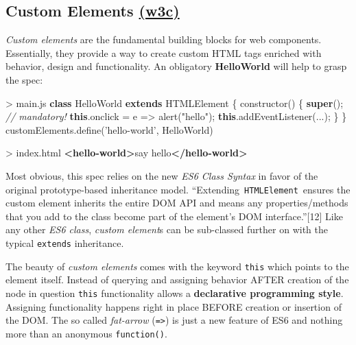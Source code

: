 \documentclass[]{assets/latex/ieee}
\newenvironment{Shaded}{}{}
\newcommand{\KeywordTok}[1]{\textcolor[rgb]{0.00,0.44,0.13}{\textbf{{#1}}}}
\newcommand{\StringTok}[1]{\textcolor[rgb]{0.25,0.44,0.63}{{#1}}}
\newcommand{\CommentTok}[1]{\textcolor[rgb]{0.38,0.63,0.69}{\textit{{#1}}}}
\newcommand{\VariableTok}[1]{\textcolor[rgb]{0.10,0.09,0.49}{{#1}}}
\newcommand{\OperatorTok}[1]{\textcolor[rgb]{0.40,0.40,0.40}{{#1}}}
\newcommand{\AttributeTok}[1]{\textcolor[rgb]{0.49,0.56,0.16}{{#1}}}
\newcommand{\NormalTok}[1]{{#1}}
\begin{document}
\subsection{\texorpdfstring{Custom Elements
\href{http://w3c.github.io/webcomponents/spec/custom/}{(w3c)}}{Custom Elements (w3c)}}\label{custom-elements-w3c}

\emph{Custom elements} are the fundamental building blocks for web
components. Essentially, they provide a way to create custom HTML tags
enriched with behavior, design and functionality. An obligatory
\textbf{HelloWorld} will help to grasp the spec:

\begin{Shaded}
\begin{Highlighting}[]
\OperatorTok{>} \VariableTok{main}\NormalTok{.}\AttributeTok{js}
\KeywordTok{class} \NormalTok{HelloWorld }\KeywordTok{extends} \NormalTok{HTMLElement }\OperatorTok{\{}
 \AttributeTok{constructor}\NormalTok{() }\OperatorTok{\{}
  \KeywordTok{super}\NormalTok{()}\OperatorTok{;} \CommentTok{// mandatory!}
  \KeywordTok{this}\NormalTok{.}\AttributeTok{onclick} \OperatorTok{=} \NormalTok{e }\OperatorTok{=>} \AttributeTok{alert}\NormalTok{(}\StringTok{"hello"}\NormalTok{)}\OperatorTok{;}
  \KeywordTok{this}\NormalTok{.}\AttributeTok{addEventListener}\NormalTok{(...)}\OperatorTok{;}
 \OperatorTok{\}}
\OperatorTok{\}}
\VariableTok{customElements}\NormalTok{.}\AttributeTok{define}\NormalTok{(}\StringTok{'hello-world'}\OperatorTok{,} \NormalTok{HelloWorld)}
\end{Highlighting}
\end{Shaded}

\begin{Shaded}
\begin{Highlighting}[]
\NormalTok{> index.html}
\KeywordTok{<hello-world>}\NormalTok{say hello}\KeywordTok{</hello-world>}
\end{Highlighting}
\end{Shaded}

Most obvious, this spec relies on the new \emph{ES6 Class Syntax} in
favor of the original prototype-based inheritance model.
``Extending~\texttt{HTMLElement}~ensures the custom element inherits the
entire DOM API and means any properties/methods that you add to the
class become part of the element's DOM interface.''{[}12{]} Like any
other \emph{ES6 class}, \emph{custom element}s can be sub-classed
further on with the typical \texttt{extends} inheritance.

The beauty of \emph{custom elements} comes with the keyword
\texttt{this} which points to the element itself. Instead of querying
and assigning behavior AFTER creation of the node in question
\texttt{this} functionality allows a \textbf{declarative programming
style}. Assigning functionality happens right in place BEFORE creation
or insertion of the DOM. The so called \emph{fat-arrow}
(\texttt{=\textgreater{}}) is just a new feature of ES6 and nothing more
than an anonymous \texttt{function()}.
\end{document}
